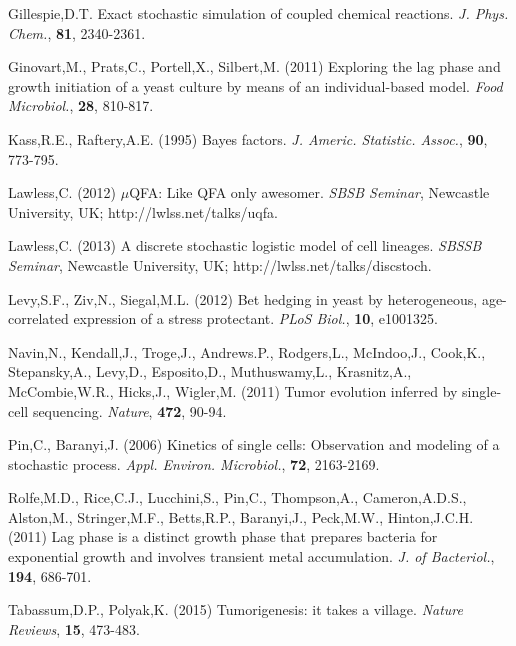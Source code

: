 \documentclass{bioinfo}
\begin{document}
\begin{thebibliography}{}
 Gillespie,D.T. Exact stochastic simulation of coupled chemical reactions. {\it J. Phys. Chem.}, {\bf 81}, 2340-2361. 


 Ginovart,M., Prats,C., Portell,X., Silbert,M. (2011) Exploring the lag phase and growth initiation of a yeast culture by means of an individual-based model. {\it Food Microbiol.}, {\bf 28}, 810-817. 

 Kass,R.E., Raftery,A.E. (1995) Bayes factors. {\it J. Americ. Statistic. Assoc.}, {\bf 90}, 773-795. 

 Lawless,C. (2012) $\mu$QFA: Like QFA only awesomer. {\it SBSB Seminar}, Newcastle University, UK; http://lwlss.net/talks/uqfa.

 Lawless,C. (2013) A discrete stochastic logistic model of cell lineages. {\it SBSSB Seminar}, Newcastle University, UK;  http://lwlss.net/talks/discstoch.

 Levy,S.F., Ziv,N., Siegal,M.L. (2012) Bet hedging in yeast by heterogeneous, age-correlated expression of a stress protectant. {\it PLoS Biol.}, {\bf 10}, e1001325. 

 Navin,N., Kendall,J., Troge,J., Andrews.P., Rodgers,L., McIndoo,J., Cook,K., Stepansky,A., Levy,D., Esposito,D., Muthuswamy,L., Krasnitz,A., McCombie,W.R., Hicks,J., Wigler,M. (2011) Tumor evolution inferred by single-cell sequencing. {\it Nature}, {\bf 472}, 90-94.	

 Pin,C., Baranyi,J. (2006) Kinetics of single cells: Observation and modeling of a stochastic process. {\it Appl. Environ. Microbiol.}, {\bf 72}, 2163-2169. 

 Rolfe,M.D., Rice,C.J., Lucchini,S., Pin,C., Thompson,A., Cameron,A.D.S., Alston,M., Stringer,M.F., Betts,R.P., Baranyi,J., Peck,M.W., Hinton,J.C.H. (2011) Lag phase is a distinct growth phase that prepares bacteria for exponential growth and involves transient metal accumulation. {\it J. of Bacteriol.}, {\bf 194}, 686-701. 

 Tabassum,D.P., Polyak,K. (2015) Tumorigenesis: it takes a village. {\it Nature Reviews}, {\bf 15}, 473-483.


\end{thebibliography}
\end{document}
